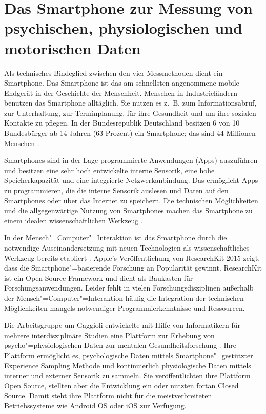 

\section{Das Smartphone zur Messung von psychischen, physiologischen und motorischen Daten} 

\label{sec:das_smartphone_zur_messung_von_psychischen_physiologischen_und_motorischen_daten}

Als technisches Bindeglied zwischen den vier Messmethoden dient ein Smartphone. Das Smartphone ist das am schnellsten angenommene mobile Endgerät in der Geschichte der Menschheit. Menschen in Industrieländern benutzen das Smartphone alltäglich. Sie nutzen es z.~B. zum Informationsabruf, zur Unterhaltung, zur Terminplanung, für ihre Gesundheit und um ihre sozialen Kontakte zu pflegen. In der Bundesrepublik Deutschland besitzen 6 von 10 Bundesbürger ab 14 Jahren (63 Prozent) ein Smartphone; das sind 44 Millionen Menschen \citep{bitkom2015}.

Smartphones sind in der Lage programmierte Anwendungen (Apps) auszuführen und besitzen eine sehr hoch entwickelte interne Sensorik, eine hohe Speicherkapazität und eine integrierte Netzwerkanbindung. Das ermöglicht Apps zu programmieren, die die interne Sensorik auslesen und Daten auf den Smartphones oder über das Internet zu speichern. Die technischen Möglichkeiten und die allgegenwärtige Nutzung von Smartphones machen das Smartphone zu einem idealen wissenschaftlichen Werkzeug \citep{Raento2009}.

In der Mensch"=Computer"=Interaktion ist das Smartphone durch die notwendige Auseinandersetzung mit neuen Technologien als wissenschaftliches Werkzeug bereits etabliert \citep{Froehlich2007}. Apple's Veröffentlichung von ResearchKit 2015 zeigt, dass die Smartphone"=basierende Forschung an Popularität gewinnt. ResearchKit ist ein Open Source Framework und dient als Baukasten für Forschungsanwendungen. Leider fehlt in vielen Forschungsdisziplinen außerhalb der Mensch"=Computer"=Interaktion häufig die Integration der technischen Möglichkeiten mangels notwendiger Programmierkenntnisse und Ressourcen.

Die Arbeitsgruppe um Gaggioli entwickelte mit Hilfe von Informatikern für mehrere interdisziplinäre Studien eine Plattform zur Erhebung von psycho"=physiologischen Daten zur mentalen Gesundheitsforschung \citep{Gaggioli2013}. Ihre Plattform ermöglicht es, psychologische Daten mittels Smartphone"=gestützter Experience Sampling Methode und kontinuierlich physiologische Daten mittels interner und externer Sensorik zu sammeln. Sie veröffentlichten ihre Plattform Open Source, stellten aber die Entwicklung ein oder nutzten fortan Closed Source. Damit steht ihre Plattform nicht für die meistverbreiteten Betriebssysteme wie Android OS oder iOS zur Verfügung.

